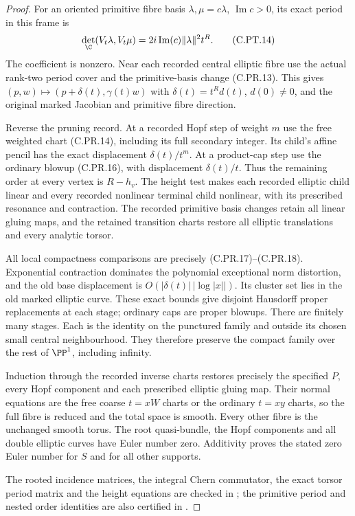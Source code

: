 \begin{proof}
For an oriented primitive fibre basis
$\lambda,\mu=c\lambda$,
$\operatorname{Im}c>0$, its exact period
in this frame is
\[
 \det_\C(V_t\lambda,V_t\mu)
       =2i\operatorname{Im}(c)\|\lambda\|^2t^R.
 \tag{C.PT.14}
\]
The coefficient is nonzero. Near each
recorded central elliptic fibre use
the actual rank-two period cover and
the primitive-basis change (C.PR.13).
This gives
$(p,w)\mapsto(p+\delta(t),\gamma(t)w)$
with $\delta(t)=t^R d(t)$, $d(0)\ne0$,
and the original marked Jacobian and
primitive fibre direction.

Reverse the pruning record. At a
recorded Hopf step of weight $m$ use
the free weighted chart (C.PR.14),
including its full secondary integer.
Its child's affine pencil has the
exact displacement $\delta(t)/t^m$.
At a product-cap step use the ordinary
blowup (C.PR.16), with displacement
$\delta(t)/t$. Thus the remaining
order at every vertex is $R-h_v$.
The height test makes each recorded
elliptic child linear and every
recorded nonlinear terminal child
nonlinear, with its prescribed
resonance and contraction. The
recorded primitive basis changes
retain all linear gluing maps,
and the retained transition charts
restore all elliptic translations
and every analytic torsor.

All local compactness comparisons
are precisely (C.PR.17)--(C.PR.18).
Exponential contraction dominates
the polynomial exceptional norm
distortion, and the old base
displacement is
$O(|\delta(t)|\,|\log|x||)$.
Its cluster set lies in the old
marked elliptic curve. These exact
bounds give disjoint Hausdorff
proper replacements at each stage;
ordinary caps are proper blowups.
There are finitely many stages.
Each is the identity on the
punctured family and outside its
chosen small central neighbourhood.
They therefore preserve the
compact family over the rest of
$\PP^1$, including infinity.

Induction through the recorded
inverse charts restores precisely
the specified $P$, every Hopf
component and each prescribed
elliptic gluing map. Their normal
equations are the free coarse
$t=xW$ charts or the ordinary
$t=xy$ charts, so the full fibre
is reduced and the total space
is smooth. Every other fibre is
the unchanged smooth torus.
The root quasi-bundle, the Hopf
components and all double
elliptic curves have Euler
number zero. Additivity proves
the stated zero Euler number
for $S$ and for all other supports.

The rooted incidence matrices,
the integral Chern commutator,
the exact torsor period matrix
and the height equations are
checked in
;
the primitive period and nested
order identities are also
certified in
.
\end{proof}
